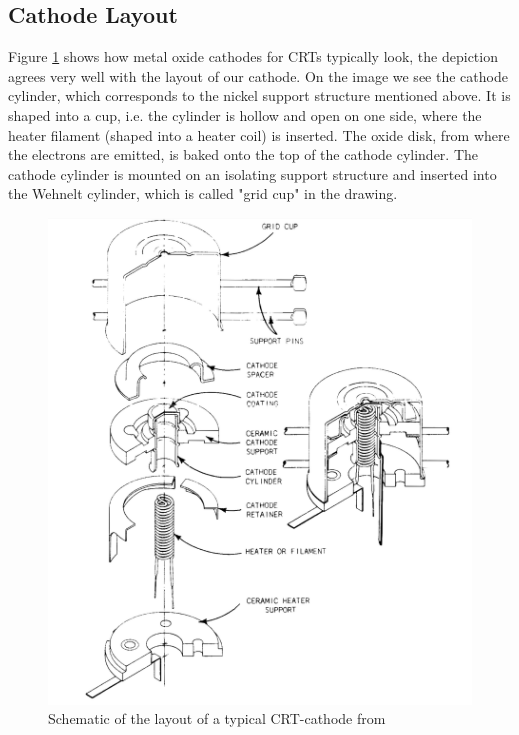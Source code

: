 \subsection{Cathode Layout}

Figure \ref{fig:cathodelayout} shows how metal oxide cathodes for CRTs typically look, the depiction agrees very well with the layout of our cathode. On the image we see the cathode cylinder, which corresponds to the nickel support structure mentioned above. It is shaped into a cup, i.e. the cylinder is hollow and open on one side, where the heater filament (shaped into a heater coil) is inserted. The oxide disk, from where the electrons are emitted, is baked onto the top of the cathode cylinder. The cathode cylinder is mounted on an isolating support structure and inserted into the Wehnelt cylinder, which is called "grid cup" in the drawing. 
  

\begin{figure}
	\centering
	\includegraphics[width=0.6\linewidth]{Chapters/CRT-Basics/Cathode_layout}
	\caption{Schematic of the layout of a typical CRT-cathode from \cite{deVere69}}
	\label{fig:cathodelayout}
\end{figure}














